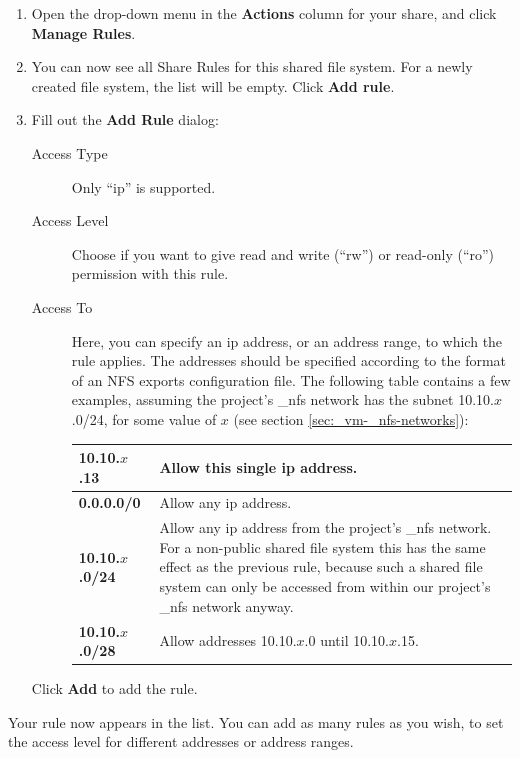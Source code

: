 \begin{enumerate}
\item Open the drop-down menu in the \textbf{Actions} column for your share, and click \textbf{Manage Rules}.
\item You can now see all Share Rules for this shared file system.
  For a newly created file system, the list will be empty.  Click \textbf{Add rule}.
\item Fill out the \textbf{Add Rule} dialog:
  \begin{description}
  \item[Access Type] Only ``ip'' is supported.
  \item[Access Level] Choose if you want to give read and write
    (``rw'') or read-only (``ro'') permission with this rule.
  \item[Access To] Here, you can specify an ip address, or an address
    range, to which the rule applies.  The addresses should be
    specified according to the format of an NFS exports configuration
    file.  The following table contains a few examples, assuming the
    project's \_nfs network has the subnet 10.10.$x$.0/24, for some
    value of $x$ (see section
    \ref{sec:_vm-_nfs-networks}):\\
    \begin{tabular}{>{\bfseries}lp{}}
      10.10.$x$.13 & Allow this single ip address.
      \\ \hline
      0.0.0.0/0 & Allow any ip address.
      \\ \hline
      10.10.$x$.0/24 & Allow any ip address from the project's \_nfs network.  For a non-public shared file system this has the same effect as the previous rule, because such a shared file system can only be accessed from within our project's \_nfs network anyway.
      \\ \hline 
      10.10.$x$.0/28 & Allow addresses 10.10.$x$.0 until 10.10.$x$.15.
      \\
    \end{tabular}

  \end{description}
  Click \textbf{Add} to add the rule.
\end{enumerate}
Your rule now appears in the list.  You can add as many rules as you
wish, to set the access level for different addresses or address
ranges.

